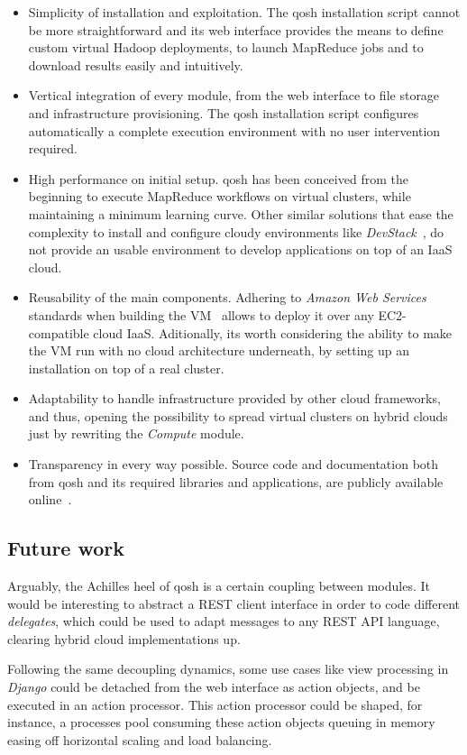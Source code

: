 \documentclass[conference]{IEEEtran}
\begin{document}
\begin{itemize}
 \item Simplicity of installation and exploitation. The qosh installation script cannot be more straightforward and its web interface provides the means to define custom virtual Hadoop deployments, to launch MapReduce jobs and to download results easily and intuitively.
 \item Vertical integration of every module, from the web interface to file storage and infrastructure provisioning. The qosh installation script configures automatically a complete execution environment with no user intervention required.
 \item High performance on initial setup. qosh has been conceived from the beginning to execute MapReduce workflows on virtual clusters, while maintaining a minimum learning curve. Other similar solutions that ease the complexity to install and configure cloudy environments like \emph{DevStack}~\cite{devstack:2013:online}, do not provide an usable environment to develop applications on top of an IaaS cloud.
 \item Reusability of the main components. Adhering to \emph{Amazon Web Services} standards when building the VM~\cite{ahvm:2013:online} allows to deploy it over any EC2-compatible cloud IaaS. Aditionally, its worth considering the ability to make the VM run with no cloud architecture underneath, by setting up an installation on top of a real cluster.
 \item Adaptability to handle infrastructure provided by other cloud frameworks, and thus, opening the possibility to spread virtual clusters on hybrid clouds just by rewriting the \emph{Compute} module.
 \item Transparency in every way possible. Source code and documentation both from qosh and its required libraries and applications, are publicly available online~\cite{qosh:2013:online}.
\end{itemize}

\subsection{Future work}
\noindent Arguably, the Achilles heel of qosh is a certain coupling between modules. It would be interesting to abstract a REST client interface in order to code different \emph{delegates}, which could be used to adapt messages to any REST API language, clearing hybrid cloud implementations up.

Following the same decoupling dynamics, some use cases like view processing in \emph{Django} could be detached from the web interface as action objects, and be executed in an action processor. This action processor could be shaped, for instance, a processes pool consuming these action objects queuing in memory easing off horizontal scaling and load balancing.
\end{document}

